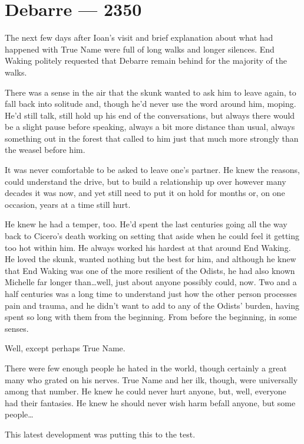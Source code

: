 \hypertarget{debarre-2350}{%
\chapter{Debarre — 2350}\label{debarre-2350}}

The next few days after Ioan's visit and brief explanation about what had happened with True Name were full of long walks and longer silences. End Waking politely requested that Debarre remain behind for the majority of the walks.

There was a sense in the air that the skunk wanted to ask him to leave again, to fall back into solitude and, though he'd never use the word around him, moping. He'd still talk, still hold up his end of the conversations, but always there would be a slight pause before speaking, always a bit more distance than usual, always something out in the forest that called to him just that much more strongly than the weasel before him.

It was never comfortable to be asked to leave one's partner. He knew the reasons, could understand the drive, but to build a relationship up over however many decades it was now, and yet still need to put it on hold for months or, on one occasion, years at a time still hurt.

He knew he had a temper, too. He'd spent the last centuries going all the way back to Cicero's death working on setting that aside when he could feel it getting too hot within him. He always worked his hardest at that around End Waking. He loved the skunk, wanted nothing but the best for him, and although he knew that End Waking was one of the more resilient of the Odists, he had also known Michelle far longer than\ldots well, just about anyone possibly could, now. Two and a half centuries was a long time to understand just how the other person processes pain and trauma, and he didn't want to add to any of the Odists' burden, having spent so long with them from the beginning. From before the beginning, in some senses.

Well, except perhaps True Name.

There were few enough people he hated in the world, though certainly a great many who grated on his nerves. True Name and her ilk, though, were universally among that number. He knew he could never hurt anyone, but, well, everyone had their fantasies. He knew he should never wish harm befall anyone, but some people\ldots{}

This latest development was putting this to the test.

